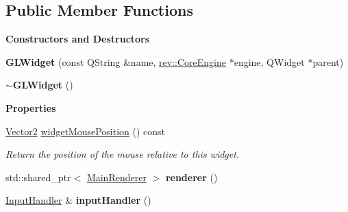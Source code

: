 \subsection*{Public Member Functions}
\begin{Indent}\textbf{ Constructors and Destructors}\par
\begin{DoxyCompactItemize}
\item 
\mbox{\label{classrev_1_1_view_1_1_g_l_widget_acea2a2885a65e3e3b305f8bd69bb24ff}} 
{\bfseries G\+L\+Widget} (const Q\+String \&name, \mbox{\hyperlink{classrev_1_1_core_engine}{rev\+::\+Core\+Engine}} $\ast$engine, Q\+Widget $\ast$parent)
\item 
\mbox{\label{classrev_1_1_view_1_1_g_l_widget_ab76346868e96d5258e27852911395246}} 
{\bfseries $\sim$\+G\+L\+Widget} ()
\end{DoxyCompactItemize}
\end{Indent}
\begin{Indent}\textbf{ Properties}\par
\begin{DoxyCompactItemize}
\item 
\mbox{\label{classrev_1_1_view_1_1_g_l_widget_af3c163e60e8cf26494ebaa7a66389038}} 
\mbox{\hyperlink{classrev_1_1_vector}{Vector2}} \mbox{\hyperlink{classrev_1_1_view_1_1_g_l_widget_af3c163e60e8cf26494ebaa7a66389038}{widget\+Mouse\+Position}} () const
\begin{DoxyCompactList}\small\item\em Return the position of the mouse relative to this widget. \end{DoxyCompactList}\item 
\mbox{\label{classrev_1_1_view_1_1_g_l_widget_aea0d286dcf49a5a6686d09728f63f29a}} 
std\+::shared\+\_\+ptr$<$ \mbox{\hyperlink{classrev_1_1_main_renderer}{Main\+Renderer}} $>$ {\bfseries renderer} ()
\item 
\mbox{\label{classrev_1_1_view_1_1_g_l_widget_a15d9d3ef8cbb535579fa7e1fd6ebe5db}} 
\mbox{\hyperlink{classrev_1_1_input_handler}{Input\+Handler}} \& {\bfseries input\+Handler} ()
\end{DoxyCompactItemize}
\end{Indent}
